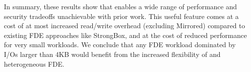 In summary, these results show that \sys enables a wide range of performance and
security tradeoffs unachievable with prior work. This useful feature comes at a
cost of at most  increased read/write overhead (excluding Mirrored)
compared to existing FDE approaches like StrongBox, and at the cost of reduced
performance for very small workloads. We conclude that any FDE workload
dominated by I/Os larger than 4KB would benefit from the increased flexibility
of \sys and heterogeneous FDE.
